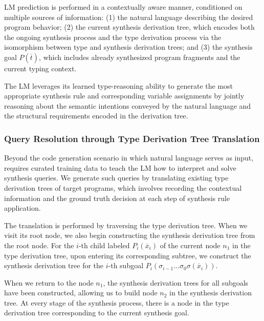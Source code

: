 LM prediction is performed in a contextually aware manner, conditioned on multiple sources of information: (1) the natural language describing the desired program behavior; (2) the current synthesis derivation tree, which encodes both the ongoing synthesis process and the type derivation process via the isomorphism between type and synthesis derivation trees; and (3) the synthesis goal $P(\overline{t})$, which includes already synthesized program fragments and the current typing context.

The LM leverages its learned type-reasoning ability to generate the most appropriate synthesis rule and corresponding variable assignments by jointly reasoning about the semantic intentions conveyed by the natural language and the structural requirements encoded in the derivation tree. 

\subsubsection{Query Resolution through Type Derivation Tree Translation}
\label{sec:translation}
Beyond the code generation scenario in which natural language serves as input, \mainname requires curated training data to teach the LM how to interpret and solve synthesis queries. 
We generate such queries by translating existing type derivation trees of target programs, which involves recording the contextual information and the ground truth decision at each step of synthesis rule application.

The translation is performed by traversing the type derivation tree. When we visit its root node, we also begin constructing the synthesis derivation tree from the root node. 
For the $i$-th child labeled $P_i(\overline{x}_i)$ of the current node $n_1$ in the type derivation tree, upon entering its corresponding subtree, we construct the synthesis derivation tree for the $i$-th subgoal $P_i(\sigma_{i-1} \ldots \sigma_0 \sigma(\overline{x}_i))$.

When we return to the node $n_1$, the synthesis derivation trees for all subgoals have been constructed, allowing us to build node $n_2$ in the synthesis derivation tree. At every stage of the synthesis process, there is a node in the type derivation tree corresponding to the current synthesis goal.

